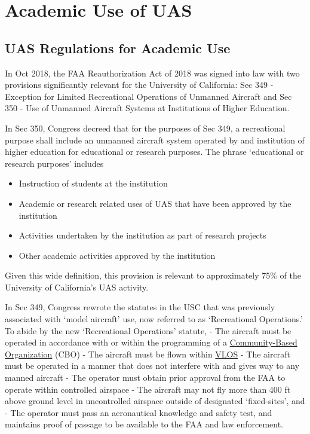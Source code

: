 \documentclass[
]{book}
\providecommand{\tightlist}{%
  \setlength{\itemsep}{0pt}\setlength{\parskip}{0pt}}
\begin{document}
\hypertarget{ch-academic-use}{%
\chapter{Academic Use of UAS}\label{ch-academic-use}}

\hypertarget{uas-regulations-for-academic-use}{%
\section{UAS Regulations for Academic Use}\label{uas-regulations-for-academic-use}}

In Oct 2018, the FAA Reauthorization Act of 2018 was signed into law with two provisions significantly relevant for the University of California: Sec 349 - Exception for Limited Recreational Operations of Unmanned Aircraft and Sec 350 - Use of Unmanned Aircraft Systems at Institutions of Higher Education.

In Sec 350, Congress decreed that for the purposes of Sec 349, a recreational purpose shall include an unmanned aircraft system operated by and institution of higher education for educational or research purposes. The phrase `educational or research purposes' includes

\begin{itemize}
\tightlist
\item
  Instruction of students at the institution
\item
  Academic or research related uses of UAS that have been approved by the institution
\item
  Activities undertaken by the institution as part of research projects
\item
  Other academic activities approved by the institution
\end{itemize}

Given this wide definition, this provision is relevant to approximately 75\% of the University of California's UAS activity.

In Sec 349, Congress rewrote the statutes in the USC that was previously associated with `model aircraft' use, now referred to as `Recreational Operations.' To abide by the new `Recreational Operations' statute,
- The aircraft must be operated in accordance with or within the programming of a \protect\hyperlink{CBO}{Community-Based Organization} (CBO)
- The aircraft must be flown within \protect\hyperlink{VLOS}{VLOS}
- The aircraft must be operated in a manner that does not interfere with and gives way to any manned aircraft
- The operator must obtain prior approval from the FAA to operate within controlled airspace
- The aircraft may not fly more than 400 ft above ground level in uncontrolled airspace outside of designated `fixed-sites', and
- The operator must pass an aeronautical knowledge and safety test, and maintains proof of passage to be available to the FAA and law enforcement.
\end{document}
